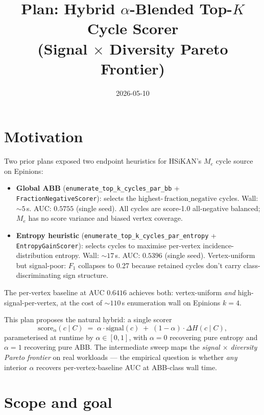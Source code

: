 \documentclass[a4paper,11pt]{article}
\title{Plan: Hybrid $\alpha$-Blended Top-$K$ Cycle Scorer\\(Signal $\times$ Diversity Pareto Frontier)}
\author{}
\date{2026-05-10}
\begin{document}
\maketitle

\section*{Motivation}

Two prior plans exposed two endpoint heuristics for HSiKAN's $M_e$
cycle source on Epinions:

\begin{itemize}
  \item \textbf{Global ABB} (\texttt{enumerate\_top\_k\_cycles\_par\_bb}
    + \texttt{FractionNegativeScorer}): selects the highest-$\,\mathrm{fraction\_negative}$
    cycles. Wall: $\sim 5$\,s. AUC: $0.5755$ (single seed). All
    cycles are score-1.0 all-negative balanced; $M_e$ has no score
    variance and biased vertex coverage.
  \item \textbf{Entropy heuristic}
    (\texttt{enumerate\_top\_k\_cycles\_par\_entropy} +
    \texttt{EntropyGainScorer}): selects cycles to maximise per-vertex
    incidence-distribution entropy. Wall: $\sim 17$\,s. AUC: $0.5396$
    (single seed). Vertex-uniform but signal-poor: $F_1$ collapses
    to 0.27 because retained cycles don't carry class-discriminating
    sign structure.
\end{itemize}

The per-vertex baseline at AUC $0.6416$ achieves both: vertex-uniform
\emph{and} high-signal-per-vertex, at the cost of $\sim 110$\,s
enumeration wall on Epinions $k{=}4$.

This plan proposes the natural hybrid: a single scorer
\[
  \mathrm{score}_\alpha(c \mid C) \;=\;
  \alpha \cdot \mathrm{signal}(c) \;+\; (1 - \alpha) \cdot
  \Delta H(c \mid C),
\]
parameterised at runtime by $\alpha \in [0, 1]$, with $\alpha{=}0$
recovering pure entropy and $\alpha{=}1$ recovering pure ABB.  The
intermediate sweep maps the \emph{signal $\times$ diversity Pareto
frontier} on real workloads — the empirical question is whether
\emph{any} interior $\alpha$ recovers per-vertex-baseline AUC at
ABB-class wall time.

\section*{Scope and goal}
\end{document}
